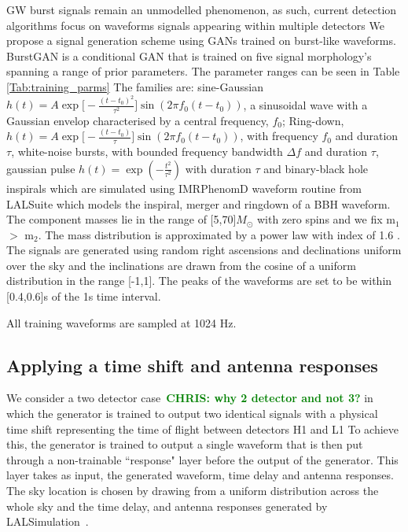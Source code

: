 \documentclass[12pt]{iopart}
\newcommand{\chris}[1]{\textbf{\textcolor{green}{CHRIS: #1}}}
\begin{document}
GW burst signals remain an unmodelled phenomenon, as such, current
detection algorithms focus on waveforms signals appearing within multiple detectors We propose a
signal generation scheme using \acp{GAN} trained on burst-like
waveforms. BurstGAN is a conditional GAN that is trained on five signal morphology's spanning a range of prior
parameters. The parameter ranges can be seen in Table \ref{Tab:training_parms} The families are: sine-Gaussian $h(t) = A \exp\bigg[ - \frac{(t-t_{0})^2}{\tau^2} \bigg] \sin (2 \pi f_0 (t-t_0))$, a sinusoidal wave with a Gaussian envelop characterised by a central frequency, $f_0$; Ring-down, $h(t) = A \exp \bigg[-\frac{(t-t_0)}{\tau}\bigg]\sin(2 \pi f_0 (t-t_0))$, with frequency $f_0$ and duration $\tau$, white-noise bursts, with bounded frequency bandwidth $\Delta f$ and duration $\tau$, gaussian pulse $h(t) = \exp(-\frac{t^2}{\tau^2})$ with duration $\tau$ and binary-black hole inspirals which are simulated using IMRPhenomD waveform \cite{Khan_2016} routine from
LALSuite \cite{lalsuite} which models the
inspiral, merger and ringdown of a \ac{BBH} waveform. The component masses lie
in the range of [5,70]$M_{\odot}$ with zero spins
and we fix m$_1$ $>$ m$_2$. The mass distribution is approximated by a power
law with index of 1.6 \cite{Abbott_2019}. The signals are generated using random right ascensions and
declinations uniform over the sky and the inclinations are drawn from the
cosine of a uniform distribution in the range [-1,1]. The peaks of the
waveforms are set to be within [0.4,0.6]s of the 1s time interval.

All training waveforms are sampled at 1024 Hz.
%

\subsection{Applying a time shift and antenna responses}

%
We consider a two detector case~\chris{why 2 detector and not 3?} in which the
generator is trained to output two identical signals with a physical time shift
representing the time of flight between detectors H1 and L1 To achieve this, the generator
is trained to output a single waveform that is then put through a non-trainable
``response" layer before the output of the generator. This layer takes as input, the generated waveform, time delay and antenna responses. The sky location is chosen by drawing from a uniform distribution across the whole sky and the time delay, and antenna responses generated by LALSimulation~\cite{lalsuite}. 
\end{document}
